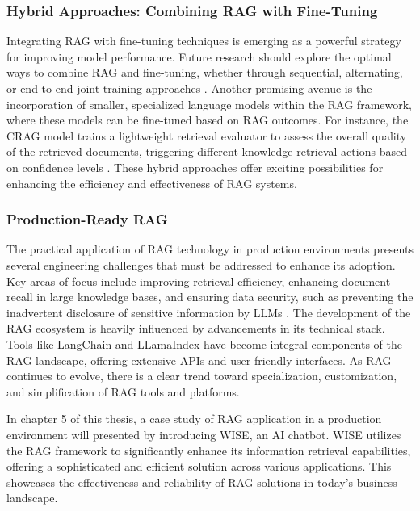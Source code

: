 \subsubsection{Hybrid Approaches: Combining RAG with Fine-Tuning}

Integrating RAG with fine-tuning techniques is emerging as a powerful strategy for improving model performance. Future research should explore the optimal ways to combine RAG and fine-tuning, whether through sequential, alternating, or end-to-end joint training approaches \cite{lin2023ra}. Another promising avenue is the incorporation of smaller, specialized language models within the RAG framework, where these models can be fine-tuned based on RAG outcomes. For instance, the CRAG model trains a lightweight retrieval evaluator to assess the overall quality of the retrieved documents, triggering different knowledge retrieval actions based on confidence levels \cite{yan2024corrective}. These hybrid approaches offer exciting possibilities for enhancing the efficiency and effectiveness of RAG systems.

\subsubsection{Production-Ready RAG}

The practical application of RAG technology in production environments presents several engineering challenges that must be addressed to enhance its adoption. Key areas of focus include improving retrieval efficiency, enhancing document recall in large knowledge bases, and ensuring data security, such as preventing the inadvertent disclosure of sensitive information by LLMs \cite{alon2022neuro}. The development of the RAG ecosystem is heavily influenced by advancements in its technical stack. Tools like LangChain and LLamaIndex have become integral components of the RAG landscape, offering extensive APIs and user-friendly interfaces. As RAG continues to evolve, there is a clear trend toward specialization, customization, and simplification of RAG tools and platforms.

In chapter 5 of this thesis, a case study of RAG application in a production environment will presented by introducing WISE, an AI chatbot. WISE utilizes the RAG framework to significantly enhance its information retrieval capabilities, offering a sophisticated and efficient solution across various applications. This showcases the effectiveness and reliability of RAG solutions in today’s business landscape.

